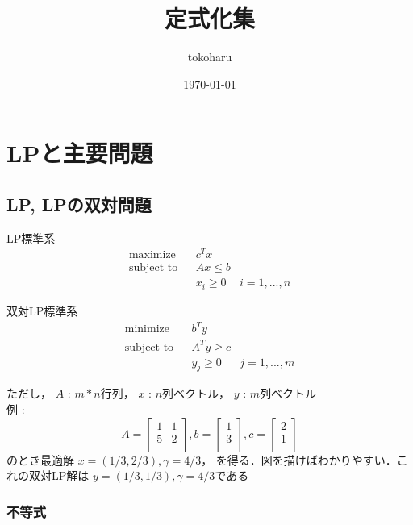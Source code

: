 \documentclass[13pt, a4paper, landscape]{jarticle}
\title{定式化集}
\author{tokoharu}
\date {\today}
\theoremstyle{nonitalic} %
\begin{document}
\maketitle

\section{LPと主要問題}
\subsection {LP, LPの双対問題}

LP標準系
\begin{align}
 &&&&&\textrm{maximize}   && c^Tx \\
 &&&&&\textrm{subject to} && Ax \leq b  &&&&&\\
 &&&&&                    && x_i \geq 0 & i = 1,...,n &&&&&
\end{align}

双対LP標準系
\begin{align}
 &&&&&\textrm{minimize}   && b^Ty \\
 &&&&&\textrm{subject to} && A^T y \geq c  &&&&&\\
 &&&&&                    && y_j \geq 0 & j = 1,...,m &&&&&
\end{align}

ただし， 
$A$ : $m*n$行列， 
$x$ : $n$列ベクトル， 
$y$ : $m$列ベクトル \\

例 : 
\begin{equation*}
 A = 
 \left[\begin{array}{cc}
  1 & 1 \\
  5 & 2 \\
 \end{array}\right],
 b = 
 \left[\begin{array}{c}
     1 \\
     3 \\
   \end{array}\right],
 c = 
 \left[\begin{array}{c}
     2 \\
     1 \\
 \end{array}\right]
\end{equation*}
のとき最適解 $x = (1/3, 2/3) , \gamma = 4/3  $， を得る．図を描けばわかりやすい．これの双対LP解は
$y = (1/3, 1/3), \gamma = 4/3$である

\subsubsection{不等式}
\end{document}

